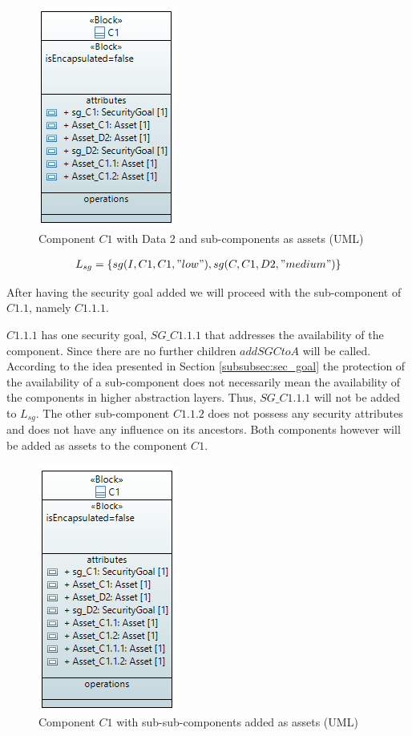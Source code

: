 \begin{figure}[H]
\centering
        \includegraphics[scale=0.9]{pictures/block_c1_data2}
    \caption{Component $C1$ with Data 2 and sub-components as assets (UML)}
\end{figure}

\begin{align*}
L_{sg} = \{sg(I,C1,C1,"low"), sg(C,C1,D2, "medium")\}
\end{align*}

After having the security goal added we will proceed with the sub-component of $C1.1$, namely $C1.1.1$.

$C1.1.1$ has one security goal, $SG\_C1.1.1$ that addresses the availability of the component. Since there are no further children $addSGCtoA$ will be called. According to the idea presented in Section \ref{subsubsec:sec_goal} the protection of the availability of a sub-component does not necessarily mean the availability of the components in higher abstraction layers. Thus, $SG\_C1.1.1$ will not be added to $L_{sg}$. The other sub-component $C1.1.2$ does not possess any security attributes and does not have any influence on its ancestors. Both components however will be added as assets to the component $C1$.

\begin{figure}[H]
\centering
        \includegraphics[scale=0.9]{pictures/block_c1_subcomps}
    \caption{Component $C1$ with sub-sub-components added as assets (UML)}
\end{figure}

